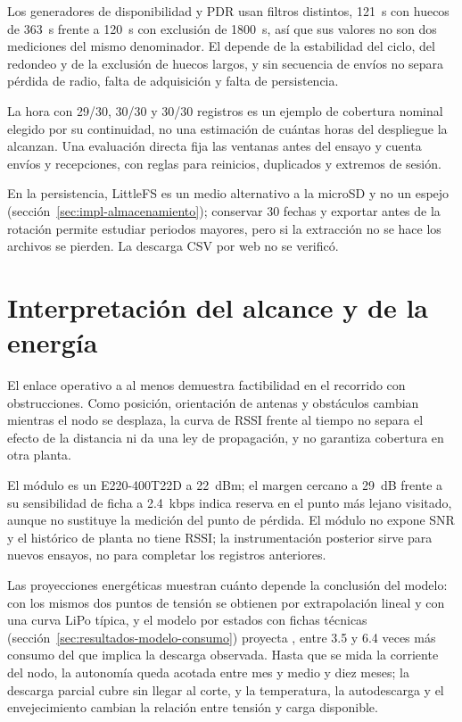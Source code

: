 Los generadores de disponibilidad y PDR usan filtros distintos, 121~s con huecos de 363~s frente a 120~s con exclusión de 1800~s, así que sus valores no son dos mediciones del mismo denominador. El \PDREstimado{} depende de la estabilidad del ciclo, del redondeo y de la exclusión de huecos largos, y sin secuencia de envíos no separa pérdida de radio, falta de adquisición y falta de persistencia.

La hora con 29/30, 30/30 y 30/30 registros es un ejemplo de cobertura nominal elegido por su continuidad, no una estimación de cuántas horas del despliegue la alcanzan. Una evaluación directa fija las ventanas antes del ensayo y cuenta envíos y recepciones, con reglas para reinicios, duplicados y extremos de sesión.

En la persistencia, LittleFS es un medio alternativo a la microSD y no un espejo (sección~\ref{sec:impl-almacenamiento}); conservar 30 fechas y exportar antes de la rotación permite estudiar periodos mayores, pero si la extracción no se hace los archivos se pierden. La descarga CSV por web no se verificó.

\section{Interpretación del alcance y de la energía}
El enlace operativo a al menos \DistanciaDemostrada{} demuestra factibilidad en el recorrido con obstrucciones. Como posición, orientación de antenas y obstáculos cambian mientras el nodo se desplaza, la curva de RSSI frente al tiempo no separa el efecto de la distancia ni da una ley de propagación, y no garantiza cobertura en otra planta.

El módulo es un E220-400T22D a 22~dBm; el margen cercano a 29~dB frente a su sensibilidad de ficha a 2.4~kbps indica reserva en el punto más lejano visitado, aunque no sustituye la medición del punto de pérdida. El módulo no expone SNR y el histórico de planta no tiene RSSI; la instrumentación posterior sirve para nuevos ensayos, no para completar los registros anteriores.

Las proyecciones energéticas muestran cuánto depende la conclusión del modelo: con los mismos dos puntos de tensión se obtienen \AutonomiaLinealEstimada{} por extrapolación lineal y \AutonomiaModeloEstimada{} con una curva LiPo típica, y el modelo por estados con fichas técnicas (sección~\ref{sec:resultados-modelo-consumo}) proyecta \AutonomiaFichaRango{}, entre 3.5 y 6.4 veces más consumo del que implica la descarga observada. Hasta que se mida la corriente del nodo, la autonomía queda acotada entre mes y medio y diez meses; la descarga parcial cubre \DuracionDescarga{} sin llegar al corte, y la temperatura, la autodescarga y el envejecimiento cambian la relación entre tensión y carga disponible.

